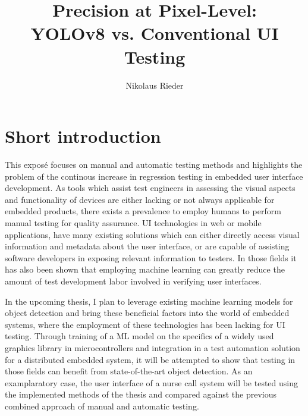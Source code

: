 \documentclass[Proposal,BIC,english,fhCitStyle,IEEE]{BASE/twbook} %
\title{Precision at Pixel-Level:\\YOLOv8 vs. Conventional UI Testing}
\author{Nikolaus Rieder}
\begin{document}
\maketitle
\chapter{Short introduction}
This exposé focuses on manual and automatic testing methods and highlights the problem of the continous increase in regression testing in embedded user interface development. As tools which assist test engineers in assessing the visual aspects and functionality of devices are either lacking or not always applicable for embedded products, there exists a prevalence to employ humans to perform manual testing for quality assurance. UI technologies in web or mobile applications, have many existing solutions which can either directly access visual information and metadata about the user interface, or are capable of assisting software developers in exposing relevant information to testers. In those fields it has also been shown that employing machine learning can greatly reduce the amount of test development labor involved in verifying user interfaces.

In the upcoming thesis, I plan to leverage existing machine learning models for object detection and bring these beneficial factors into the world of embedded systems, where the employment of these technologies has been lacking for UI testing. Through training of a ML model on the specifics of a widely used graphics library in microcontrollers and integration in a test automation solution for a distributed embedded system, it will be attempted to show that testing in those fields can benefit from state-of-the-art object detection. As an examplaratory case, the user interface of a nurse call system will be tested using the implemented methods of the thesis and compared against the previous combined approach of manual and automatic testing.
\newpage
\end{document}
